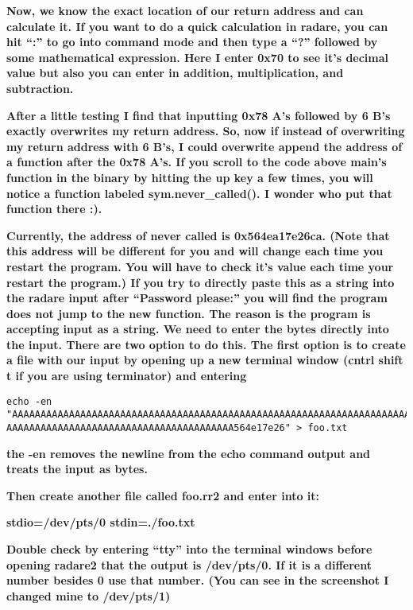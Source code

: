 \textbf{Now, we know the exact location of our return address and can calculate it. If you want to do a quick
calculation in radare, you can hit ``:'' to go into command mode and then type a ``?'' followed by some mathematical
expression. Here I enter 0x70 to see it's decimal value but also you can enter in addition, multiplication, and
subtraction.}

  
 

\textbf{After a little testing I find that inputting 0x78 A's followed by 6 B's exactly overwrites my return address.
So, now if instead of overwriting my return address with 6 B's, I could overwrite append the address of a function
after the 0x78 A's. If you scroll to the code above main's function in the binary by hitting the up key a few times,
you will notice a function labeled sym.never\_called(). I wonder who put that function there :).}

  
 

\textbf{Currently, the address of never called is 0x564ea17e26ca. (Note that this address will be different for you and
will change each time you restart the program. You will have to check it's value each time your restart the program.)
If you try to directly paste this as a string into the radare input after ``Password please:'' you will find the
program does not jump to the new function. The reason is the program is accepting input as a string. We need to enter
the bytes directly into the input. There are two option to do this. The first option is to create a file with our input
by opening up a new terminal window (cntrl shift t if you are using terminator) and entering}

\begin{verbatim}
echo -en "AAAAAAAAAAAAAAAAAAAAAAAAAAAAAAAAAAAAAAAAAAAAAAAAAAAAAAAAAAAAAAAAAAAAAAAA
AAAAAAAAAAAAAAAAAAAAAAAAAAAAAAAAAAAAAAAA564e17e26" > foo.txt
\end{verbatim}

\textbf{the -en removes the newline from the echo command output and treats the input as bytes.}

\textbf{Then create another file called foo.rr2 and enter into it:}

\textbf{stdio=/dev/pts/0\newline
stdin=./foo.txt}

\textbf{Double check by entering ``tty'' into the terminal windows before opening radare2 that the output is /dev/pts/0.
If it is a different number besides 0 use that number. (You can see in the screenshot I changed mine to /dev/pts/1)}

